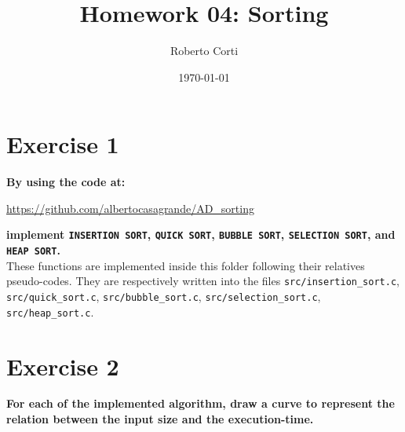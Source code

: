 \documentclass{article}
\title{Homework 04: Sorting}
\date{\today}
\author{Roberto Corti}
\begin{document}
	\maketitle
	\section*{Exercise 1}
	\textbf{By using the code at:}
		\begin{center}
			\url{https://github.com/albertocasagrande/AD_sorting}
		\end{center}
	\textbf{implement \texttt{INSERTION SORT}, \texttt{QUICK SORT}, \texttt{BUBBLE SORT}, \texttt{SELECTION SORT}, and \texttt{HEAP SORT}.} \\
	
	\noindent These functions are implemented inside this folder following their relatives pseudo-codes. They are respectively written into the files \texttt{src/insertion\_sort.c}, \texttt{src/quick\_sort.c}, \texttt{src/bubble\_sort.c}, \texttt{src/selection\_sort.c}, \texttt{src/heap\_sort.c}. 
	
	\section*{Exercise 2}
	\textbf{For each of the implemented algorithm, draw a curve to represent the relation between the input size and the execution-time.} \\
	
\end{document}

